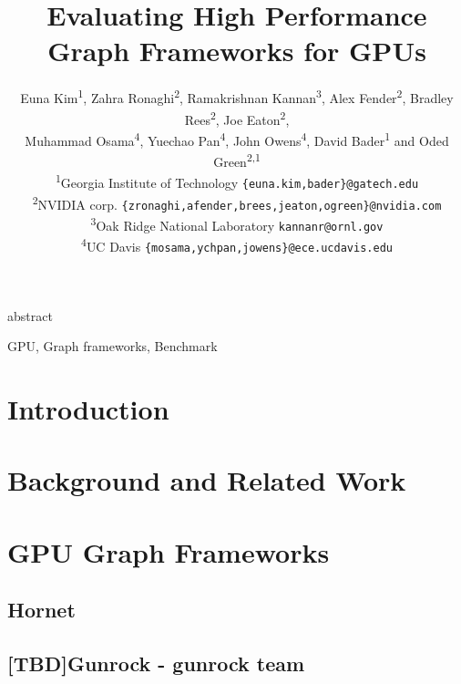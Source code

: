 \documentclass[conference]{IEEEtran}
\newcommand*{\affaddr}[1]{#1} %
\newcommand*{\affmark}[1][*]{\textsuperscript{#1}}
\newcommand*{\email}[1]{\texttt{#1}}
\begin{document}
\title{Evaluating High Performance Graph Frameworks for GPUs} 

\author{%
Euna Kim\affmark[1], Zahra Ronaghi\affmark[2], Ramakrishnan Kannan\affmark[3], Alex Fender\affmark[2], Bradley Rees\affmark[2], Joe Eaton\affmark[2],\\ Muhammad Osama\affmark[4], Yuechao Pan\affmark[4], John Owens\affmark[4], David Bader\affmark[1] and Oded Green\affmark[2,1]\\
\affaddr{\affmark[1]Georgia Institute of Technology} \email{\{euna.kim,bader\}@gatech.edu}\\
\affaddr{\affmark[2]NVIDIA corp.} \email{\{zronaghi,afender,brees,jeaton,ogreen\}@nvidia.com}\\
\affaddr{\affmark[3]Oak Ridge National Laboratory} \email{kannanr@ornl.gov}\\
\affaddr{\affmark[4]UC Davis} \email{\{mosama,ychpan,jowens\}@ece.ucdavis.edu}
}



\maketitle

 {abstract}
\begin{IEEEkeywords}
GPU, Graph frameworks, Benchmark
\end{IEEEkeywords}

\section{Introduction}
\label{sec:intro}


\section{Background and Related Work}
\label{sec:background-related}


\section{GPU Graph Frameworks} %
\label{sec:gpu-framework}

\subsection{Hornet}

\subsection{[TBD]Gunrock - gunrock team}

\end{document}
